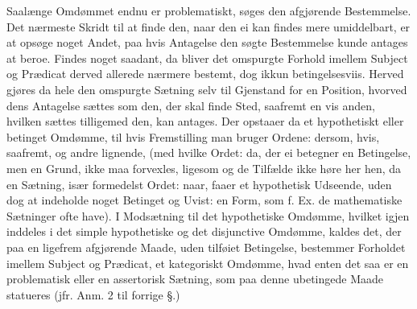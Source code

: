 \documentclass[12pt]{book}
\def\textit#1{#1}%
\def\emph#1{#1}%
\newcommand{\opage}[1]{\marginnote{\footnotesize\textit{[#1]}}}
\begin{document}
Saalænge Omdømmet endnu er \emph{problematiskt}, søges den afgjørende Bestemmelse. Det
nærmeste Skridt til at finde den, naar den ei kan findes mere umiddelbart, er at opsøge
noget Andet, paa hvis Antagelse den søgte Bestemmelse kunde antages at beroe. Findes noget
saadant, da bliver det omspurgte Forhold imellem Subject og Prædicat derved allerede
nærmere bestemt, dog ikkun betingelsesviis. Herved gjøres da hele den omspurgte Sætning
selv til Gjenstand for en Position, hvorved dens Antagelse sættes som den, der skal finde
Sted, saafremt en vis anden, hvilken sættes tilligemed den, kan antages. Der opstaaer da et
\emph{hypothetiskt} eller \emph{betinget} Omdømme, til hvis Fremstilling man bruger Ordene:
\emph{dersom}, \emph{hvis}, \emph{saafremt}, og andre lignende, (med hvilke Ordet:
\emph{da}, der ei betegner en Betingelse, men en Grund, ikke maa forvexles, ligesom og de
Tilfælde ikke høre her%
\opage{287}hen, da en Sætning, især formedelst Ordet: \emph{naar}, faaer et hypothetisk Udseende, uden
dog at indeholde noget Betinget og Uvist: en Form, som f. Ex. de mathematiske Sætninger ofte
have). I Modsætning til det hypothetiske Omdømme, hvilket igjen inddeles i det \emph{simple
hypothetiske} og det \emph{disjunctive} Omdømme, kaldes det, der paa en ligefrem afgjørende
Maade, uden tilføiet Betingelse, bestemmer Forholdet imellem Subject og Prædicat, et
\emph{kategoriskt} Omdømme, hvad enten det saa er en \emph{problematisk} eller en
\emph{assertorisk} Sætning, som paa denne ubetingede Maade statueres (jfr. Anm. 2 til
forrige §.)
\end{document}
